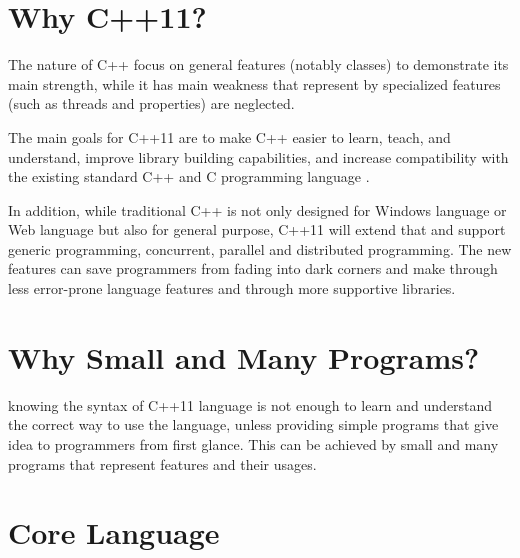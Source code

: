 \documentclass[11pt]{report}
\begin{document}
\section{Why C++11?}
\label{secton: Why C++11}
The nature of C++ focus on general features (notably classes) to demonstrate its main strength, while it has main weakness that represent by specialized features (such as threads and properties) are neglected.

The main goals for C++11 are to make C++ easier to learn, teach, and understand, improve library building capabilities, and increase compatibility with the existing standard C++ and C programming language \cite{Deitel:2012:CPP}.

In addition, while traditional C++ is not only designed for Windows \linebreak language or Web language but also for general purpose, C++11 will extend that and support generic programming, concurrent, parallel and distributed programming. 
The new features can save programmers from fading into  dark corners  and make through less error-prone language features and through more supportive libraries.


\section{Why Small and Many Programs?}
\label{section: why Small and Many programs}
knowing the syntax of C++11 language is not enough to learn and understand the correct way to use the language, unless providing  simple  programs that give idea to programmers from first glance. This can be achieved by small and many programs that represent features and their usages.


\section{Core Language}
\label{section: core language}
\end{document}
